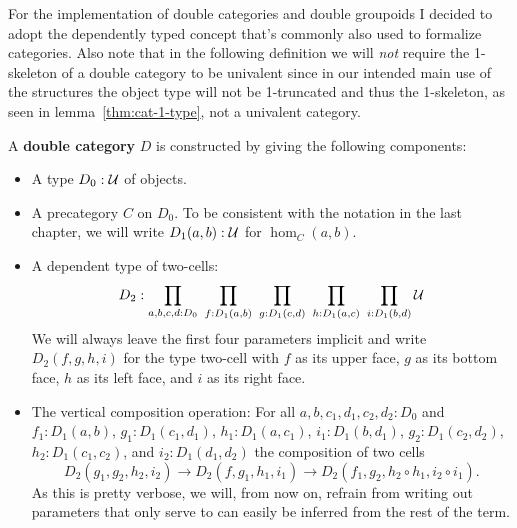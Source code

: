 For the implementation of double categories and double groupoids I decided to
adopt the dependently typed concept that's commonly also used to formalize categories.
Also note that in the following definition we will \emph{not} require the
1-skeleton of a double category to be univalent since in our intended main
use of the structures the object type will not be 1-truncated and thus the
1-skeleton, as seen in lemma~\ref{thm:cat-1-type}, not a univalent category.

\begin{defn} \label{def:dbl-cat-hott}
A \textbf{double category} $D$ is constructed by giving the following components:
\begin{itemize}
\item A type $D_0 : \mathcal{U}$ of objects.
\item A precategory $C$ on $D_0$. To be consistent with the notation in the last
chapter, we will write $D_1(a, b) : \mathcal{U}$ for $\hom_C(a, b)$.
\item A dependent type of two-cells:
\begin{equation*}
D_2 : \prod_{a,b,c,d:D_0} ~ \prod_{f:D_1(a,b)} ~ \prod_{g:D_1(c,d)}
	~ \prod_{h:D_1(a,c)} ~ \prod_{i:D_1(b,d)} \mathcal{U}
\end{equation*}
We will always leave the first four parameters implicit and write $D_2(f,g,h,i)$
for the type two-cell with $f$ as its upper face, $g$ as its bottom face,
$h$ as its left face, and $i$ as its right face.
\item The vertical composition operation: For all $a, b, c_1, d_1, c_2, d_2 : D_0$
and $f_1 : D_1(a, b)$, $g_1 : D_1(c_1, d_1)$, $h_1 : D_1(a, c_1)$, $i_1 : D_1(b, d_1)$,
$g_2 : D_1(c_2, d_2)$, $h_2 : D_1(c_1, c_2)$, and $i_2 : D_1(d_1, d_2)$ the composition
of two cells
\begin{equation*}
D_2(g_1, g_2, h_2, i_2) \to D_2(f, g_1, h_1, i_1) 
	\to D_2(f_1, g_2, h_2 \circ h_1, i_2 \circ i_1) \text{.}
\end{equation*}
As this is pretty verbose, we will, from now on, refrain from writing out parameters
that only serve to can easily be inferred from the rest of the term. %


\end{itemize}
\end{defn}
